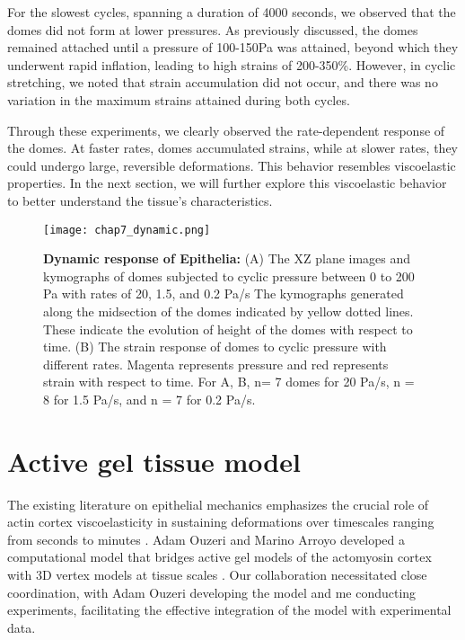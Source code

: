 For the slowest cycles, spanning a duration of 4000 seconds, we observed that the domes did not form at lower pressures. As previously discussed, the domes remained attached until a pressure of 100-150Pa was attained, beyond which they underwent rapid inflation, leading to high strains of 200-350\%. However, in cyclic stretching, we noted that strain accumulation did not occur, and there was no variation in the maximum strains attained during both cycles.

Through these experiments, we clearly observed the rate-dependent response of the domes. At faster rates, domes accumulated strains, while at slower rates, they could undergo large, reversible deformations. This behavior resembles viscoelastic properties. In the next section, we will further explore this viscoelastic behavior to better understand the tissue's characteristics.

\begin{figure}[]
	\centering
	\texttt{[image: chap7\_dynamic.png]}
	\caption{\label{fig_7_6} \textbf{Dynamic response of Epithelia:} (A) The XZ plane images and kymographs of domes subjected to cyclic pressure between 0 to 200 Pa with rates of 20, 1.5, and 0.2 Pa/s The kymographs generated along the midsection of the domes indicated by yellow dotted lines. These indicate the evolution of height of the domes with respect to time. (B) The strain response of domes to cyclic pressure with different rates. Magenta represents pressure and red represents strain with respect to time. For A, B, n= 7 domes for 20 Pa/s, n = 8 for 1.5 Pa/s, and n = 7 for 0.2 Pa/s. 
	}
\end{figure}

\hypertarget{active-gel-tissue-model}{%
	\section{Active gel tissue model}\label{active-gel-tissue-model}}

The existing literature on epithelial mechanics emphasizes the crucial role of actin cortex viscoelasticity in sustaining deformations over timescales ranging from seconds to minutes \cite{kelkar2020,clement2017,khalilgharibi2019}. Adam Ouzeri and Marino Arroyo developed a computational model that bridges active gel models of the actomyosin cortex with 3D vertex models at tissue scales \cite{ouzeri2023}. Our collaboration necessitated close coordination, with Adam Ouzeri developing the model and me conducting experiments, facilitating the effective integration of the model with experimental data.

